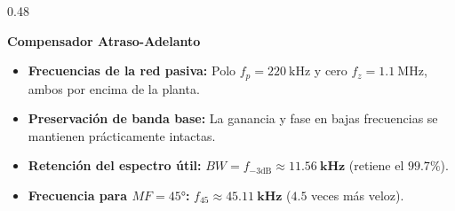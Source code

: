 \documentclass[aspectratio=169, 10pt]{beamer}
\begin{document}
\begin{frame}
\begin{columns}[t, onlytextwidth]
    \begin{column}{0.48\textwidth}
      \begin{tarjeta}[colframe=BlueAccent]
        {\fontsize{9pt}{11pt}\selectfont \textbf{\color{BlueAccent} Compensador Atraso-Adelanto}}\\[2pt]
        {\fontsize{8pt}{10pt}\selectfont
        \begin{itemize}\setlength{\itemsep}{2.5pt}
          \item \textbf{Frecuencias de la red pasiva:}
          Polo $f_p = \qty{220}{\kilo\hertz}$ y cero $f_z = \qty{1.1}{\mega\hertz}$, ambos por encima de la planta.
          \item \textbf{Preservación de banda base:}
          La ganancia y fase en bajas frecuencias se mantienen prácticamente intactas.
          \item \textbf{Retención del espectro útil:}
          $BW = f_{-3\text{dB}} \approx \mathbf{\qty{11.56}{\kilo\hertz}}$ (retiene el $\mathbf{99.7\%}$).
          \item \textbf{Frecuencia para $MF = \ang{45}$:}
          $f_{45} \approx \mathbf{\qty{45.11}{\kilo\hertz}}$ ($4.5$ veces más veloz).
        \end{itemize}
        }
      \end{tarjeta}
    \end{column}
  \end{columns}
\end{frame}

\end{document}
